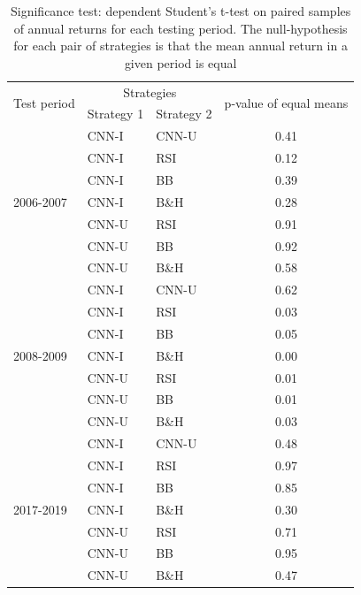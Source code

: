 \documentclass[11pt, a4paper]{article}
\begin{document}
\begin{table}[H]
\centering
\begin{tabular}{l|l|l|c}
\multicolumn{1}{m{1cm}|}{\multirow{2}{1cm}{Test period}}  & \multicolumn{2}{c|}{Strategies}  & \multicolumn{1}{m{2cm}}{\multirow{2}{2cm}{p-value of equal means}} \\ \cline{2-3}
             & Strategy 1 & Strategy 2 &         \\ \hline \hline
\multirow{7}{1cm}{2006-2007}  & CNN-I      & CNN-U      & 0.41    \\
             & CNN-I      & RSI        & 0.12    \\
             & CNN-I      & BB         & 0.39    \\
             & CNN-I      & B\&H       & 0.28    \\
             & CNN-U      & RSI        & 0.91    \\
             & CNN-U      & BB         & 0.92    \\
             & CNN-U      & B\&H       & 0.58    \\ \hline
\multirow{7}{1cm}{2008-2009} & CNN-I      & CNN-U      & 0.62    \\
             & CNN-I      & RSI        & 0.03    \\
             & CNN-I      & BB         & 0.05    \\
             & CNN-I      & B\&H       & 0.00    \\
             & CNN-U      & RSI        & 0.01    \\
             & CNN-U      & BB         & 0.01    \\
             & CNN-U      & B\&H       & 0.03    \\ \hline
\multirow{7}{1cm}{2017-2019}  & CNN-I      & CNN-U      & 0.48    \\
             & CNN-I      & RSI        & 0.97    \\
             & CNN-I      & BB         & 0.85    \\
             & CNN-I      & B\&H       & 0.30    \\
             & CNN-U      & RSI        & 0.71    \\
             & CNN-U      & BB         & 0.95    \\
             & CNN-U      & B\&H       & 0.47   
\end{tabular}
\caption{Significance test: dependent Student’s t-test on paired samples of annual returns for each testing period. The null-hypothesis for each pair of strategies is that the mean annual return in a given period is equal}
\label{tbl:AnnRes_Signf}
\end{table}
\end{document}
